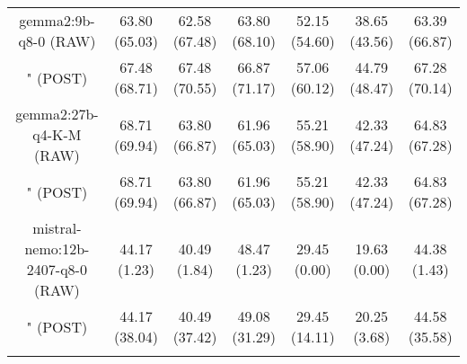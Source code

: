 \begin{table}[]
{\begin{tabular}{ccccccc}
      \multicolumn{1}{c|}{gemma2:9b-q8-0 (RAW)} & 63.80 (65.03) & 62.58 (67.48) & \multicolumn{1}{c|}{63.80 (68.10)} & 52.15 (54.60) & \multicolumn{1}{c|}{38.65 (43.56)} & 63.39 (66.87) \\

      \multicolumn{1}{c|}{" (POST)} & 67.48 (68.71) & 67.48 (70.55) & \multicolumn{1}{c|}{66.87 (71.17)} & 57.06 (60.12) & \multicolumn{1}{c|}{44.79 (48.47)} & 67.28 (70.14) \\
      \cline{1-7}

      \multicolumn{1}{c|}{gemma2:27b-q4-K-M (RAW)} & 68.71 (69.94) & 63.80 (66.87) & \multicolumn{1}{c|}{61.96 (65.03)} & 55.21 (58.90) & \multicolumn{1}{c|}{42.33 (47.24)} & 64.83 (67.28) \\

      \multicolumn{1}{c|}{" (POST)} & 68.71 (69.94) & 63.80 (66.87) & \multicolumn{1}{c|}{61.96 (65.03)} & 55.21 (58.90) & \multicolumn{1}{c|}{42.33 (47.24)} & 64.83 (67.28) \\
      \cline{1-7}

      \multicolumn{1}{c|}{mistral-nemo:12b-2407-q8-0 (RAW)} & 44.17 (1.23) & 40.49 (1.84) & \multicolumn{1}{c|}{48.47 (1.23)} & 29.45 (0.00) & \multicolumn{1}{c|}{19.63 (0.00)} & 44.38 (1.43) \\

      \multicolumn{1}{c|}{" (POST)} & 44.17 (38.04) & 40.49 (37.42) & \multicolumn{1}{c|}{49.08 (31.29)} & 29.45 (14.11) & \multicolumn{1}{c|}{20.25 (3.68)} & 44.58 (35.58) \\
      \cline{1-7}

      \\ \hline
    \end{tabular}%
  }
\end{table}